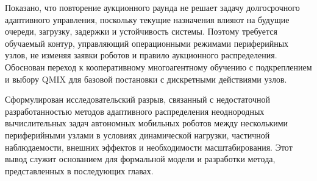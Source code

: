 Показано, что повторение аукционного раунда не решает задачу долгосрочного адаптивного управления, поскольку текущие назначения влияют на будущие очереди, загрузку, задержки и устойчивость системы. Поэтому требуется обучаемый контур, управляющий операционными режимами периферийных узлов, не изменяя заявки роботов и правило аукционного распределения. Обоснован переход к кооперативному многоагентному обучению с подкреплением и выбору QMIX для базовой постановки с дискретными действиями узлов.

Сформулирован исследовательский разрыв, связанный с недостаточной разработанностью методов адаптивного распределения неоднородных вычислительных задач автономных мобильных роботов между несколькими периферийными узлами в условиях динамической нагрузки, частичной наблюдаемости, внешних эффектов и необходимости масштабирования. Этот вывод служит основанием для формальной модели и разработки метода, представленных в последующих главах.

